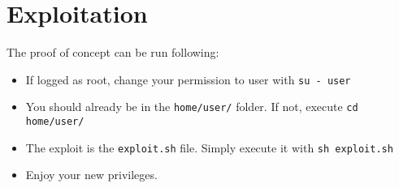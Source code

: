 \section{Exploitation}
The proof of concept can be run following:

\begin{itemize}
\item If logged as root, change your permission to user with {\tt su - user}
\item You should already be in the {\tt home/user/} folder. If not, execute {\tt cd home/user/}
\item The exploit is the {\tt exploit.sh} file. Simply execute it with {\tt sh exploit.sh}
\item Enjoy your new privileges.
\end{itemize}

